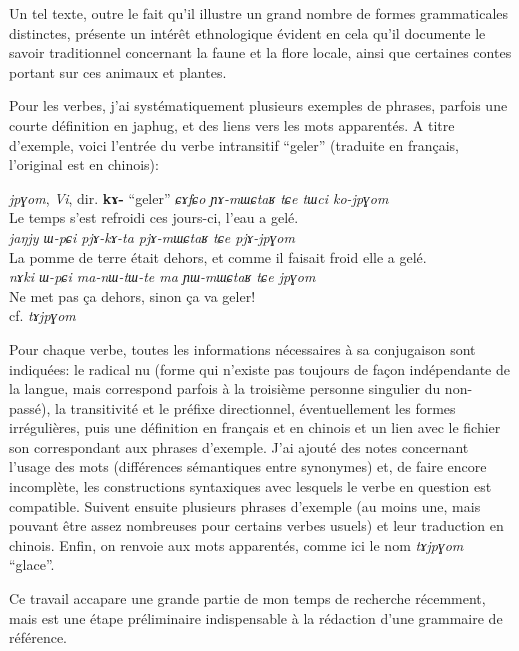 \documentclass[oldfontcommands,oneside,a4paper,11pt]{memoir}
\begin{document}
Un tel texte, outre le fait qu'il illustre un grand nombre de formes grammaticales distinctes, présente un intérêt ethnologique évident en cela qu'il documente le savoir traditionnel concernant la faune et la flore locale, ainsi que certaines contes  portant sur ces animaux et plantes. 

Pour les verbes, j'ai systématiquement plusieurs exemples de phrases, parfois une courte définition en japhug, et des liens vers les mots apparentés. A titre d'exemple, voici l'entrée du verbe intransitif ``geler'' (traduite en français, l'original est en chinois):

\begin{exe}
\ex \textit{jpɣom},	\textit{Vi}, dir. \textbf{kɤ-} ``geler''  
\glt \textit{ɕɤfɕo ɲɤ-mɯɕtaʁ tɕe tɯci ko-jpɣom} \\
   Le temps s'est refroidi ces jours-ci, l'eau a gelé. \\
\glt  \textit{jaŋjy ɯ-pɕi pjɤ-kɤ-ta pjɤ-mɯɕtaʁ tɕe pjɤ-jpɣom} \\
  La pomme de terre était dehors, et comme il faisait froid elle a gelé. \\
\glt  \textit{nɤki ɯ-pɕi ma-nɯ-tɯ-te ma ɲɯ-mɯɕtaʁ tɕe jpɣom} \\
  Ne met pas ça dehors, sinon ça va geler! \\
  
  \glt cf. \textit{tɤjpɣom}
\end{exe}
Pour chaque verbe, toutes les informations nécessaires à sa conjugaison sont indiquées: le radical nu (forme qui n'existe pas toujours de façon indépendante de la langue, mais correspond parfois à la troisième personne singulier du non-passé), la transitivité et le préfixe directionnel, éventuellement les formes irrégulières, puis une définition en français et en chinois et un lien avec le fichier son correspondant aux phrases d'exemple. J'ai ajouté des notes concernant l'usage des mots (différences sémantiques entre synonymes) et, de faire encore incomplète, les constructions syntaxiques avec lesquels le verbe en question est compatible. Suivent ensuite plusieurs phrases d'exemple (au moins une, mais pouvant être assez nombreuses pour certains verbes usuels) et leur traduction en chinois. Enfin, on renvoie aux mots apparentés, comme ici le nom \textit{tɤjpɣom} ``glace''.


	
	Ce travail accapare une grande partie de mon temps de recherche récemment, mais est une étape préliminaire indispensable à la rédaction d'une grammaire de référence. 
	
\end{document}
